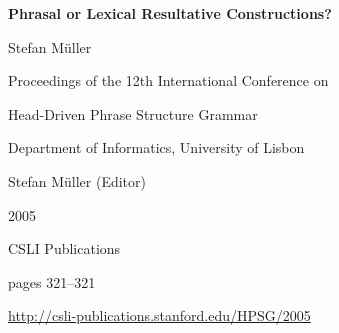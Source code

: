 \documentclass[a4paper,11pt]{article}
\begin{document}
\begin{center}
  {\huge\bf Phrasal or Lexical Resultative Constructions?\par}

  \bigskip

  {\LARGE Stefan Müller\par}

  \vspace*{3\bigskipamount}

  Proceedings of the 12th International Conference on\par Head-Driven Phrase Structure Grammar

  \bigskip

  Department of Informatics, University of Lisbon

  \medskip

  Stefan Müller (Editor)

  \medskip

  2005

  \medskip

  CSLI Publications

  \medskip

  pages 321--321

  \medskip

  \url{http://csli-publications.stanford.edu/HPSG/2005}
\end{center}

\newpage

        
\end{document}
